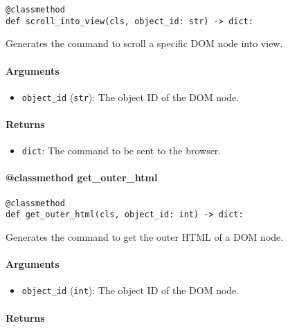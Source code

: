 \documentclass{article}
\begin{document}
\begin{lstlisting}[style=pythonstyle]
@classmethod
def scroll_into_view(cls, object_id: str) -> dict:
\end{lstlisting}

\noindent Generates the command to scroll a specific DOM node into view.

\paragraph{Arguments}

\begin{itemize}
    \item \lstinline[style=pythonstyle]|object_id| (\lstinline[style=pythonstyle]|str|): The object ID of the DOM node.
\end{itemize}

\paragraph{Returns}

\begin{itemize}
    \item \lstinline[style=pythonstyle]|dict|: The command to be sent to the browser.
\end{itemize}

\paragraph{@classmethod get\_outer\_html}

\begin{lstlisting}[style=pythonstyle]
@classmethod
def get_outer_html(cls, object_id: int) -> dict:
\end{lstlisting}

\noindent Generates the command to get the outer HTML of a DOM node.

\paragraph{Arguments}

\begin{itemize}
    \item \lstinline[style=pythonstyle]|object_id| (\lstinline[style=pythonstyle]|int|): The object ID of the DOM node.
\end{itemize}

\paragraph{Returns}
\end{document}

